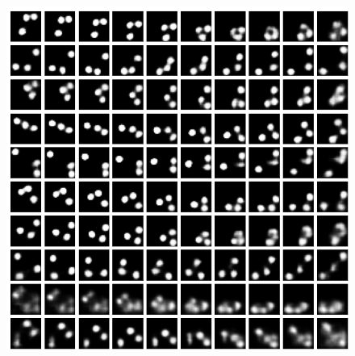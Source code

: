 \begin{frame}
\begin{figure}[h!]
\begin{minipage}{0.32\textwidth}
		\end{minipage}
		\begin{minipage}{0.32\textwidth}
			\center
			\includegraphics[scale=0.12]{Bilder/bouncingBalls_VAElat2}
		\end{minipage}
	\end{figure}
	
\end{frame}
